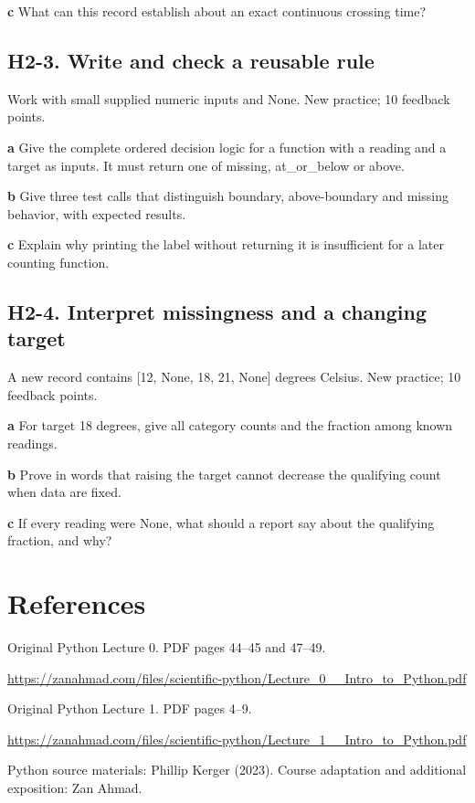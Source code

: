 \documentclass[11pt,letterpaper]{article}
\theoremstyle{definition}\newtheorem{definition}{Definition}\newtheorem{example}{Example}
\numberwithin{equation}{section}
\begin{document}
\textbf{c} What can this record establish about an exact continuous crossing time?

\par\noindent\begin{minipage}{\linewidth}
\subsection*{H2-3. Write and check a reusable rule}
Work with small supplied numeric inputs and None. New practice; 10 feedback points.

\textbf{a} Give the complete ordered decision logic for a function with a reading and a target as inputs. It must return one of missing, at\_or\_below or above.

\end{minipage}\par\medskip
\textbf{b} Give three test calls that distinguish boundary, above-boundary and missing behavior, with expected results.

\textbf{c} Explain why printing the label without returning it is insufficient for a later counting function.

\par\noindent\begin{minipage}{\linewidth}
\subsection*{H2-4. Interpret missingness and a changing target}
A new record contains [12, None, 18, 21, None] degrees Celsius. New practice; 10 feedback points.

\textbf{a} For target 18 degrees, give all category counts and the fraction among known readings.

\end{minipage}\par\medskip
\textbf{b} Prove in words that raising the target cannot decrease the qualifying count when data are fixed.

\textbf{c} If every reading were None, what should a report say about the qualifying fraction, and why?

\section*{References}
\noindent\begin{minipage}{\linewidth}
Original Python Lecture 0. PDF pages 44--45 and 47--49.

\url{https://zanahmad.com/files/scientific-python/Lecture_0__Intro_to_Python.pdf}
\end{minipage}\par\medskip
\noindent\begin{minipage}{\linewidth}
Original Python Lecture 1. PDF pages 4--9.

\url{https://zanahmad.com/files/scientific-python/Lecture_1__Intro_to_Python.pdf}
\end{minipage}\par\medskip
Python source materials: Phillip Kerger (2023). Course adaptation and additional exposition: Zan Ahmad.
\end{document}
